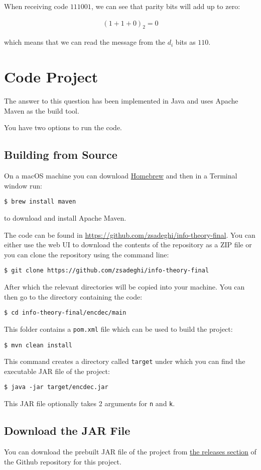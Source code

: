 \documentclass{article}
\newcommand{\shellprompt}[1]{{%
\vspace{0.3in}%
\hangindent=0.5in%
\small{\texttt{\$ #1}}%
\vspace{0.3in}%
}}
\begin{document}
When receiving code $111001$, we can see that parity bits will add up to zero:

\begin{align*}
  (1 + 1 + 0)_2=0
\end{align*}

which means that we can read the message from the $d_i$ bits as $110$.

\section{Code Project}

The answer to this question has been implemented in Java and uses Apache Maven
as the build tool.

You have two options to run the code.

\subsection{Building from Source}

On a macOS machine you can download \href{http://brew.sh}{Homebrew} and then in a
Terminal window run:

\shellprompt{brew install maven}

to download and install Apache Maven.

The code can be found in \url{https://github.com/zsadeghi/info-theory-final}. You can
either use the web UI to download the contents of the repository as a ZIP file or you
can clone the repository using the command line:

\shellprompt{git clone https://github.com/zsadeghi/info-theory-final}

After which the relevant directories will be copied into your machine. You can then
go to the directory containing the code:

\shellprompt{cd info-theory-final/encdec/main}

This folder contains a \texttt{pom.xml} file which can be used to build the project:

\shellprompt{mvn clean install}

This command creates a directory called \texttt{target} under which you can find the
executable JAR file of the project:

\shellprompt{java -jar target/encdec.jar}

This JAR file optionally takes 2 arguments for \texttt{n} and \texttt{k}.

\subsection{Download the JAR File}

You can download the prebuilt JAR file of the project from \href{https://github.com/zsadeghi/info-theory-final/releases/tag/release}{the releases section}
of the Github repository for this project.
\end{document}
